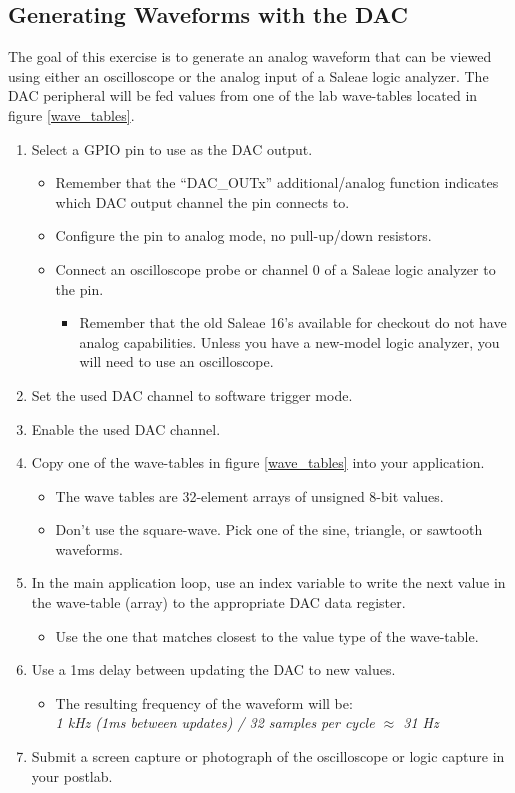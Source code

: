 \documentclass[openany,11pt,fleqn]{book} %
\begin{document}
\subsection{Generating Waveforms with the DAC}
The goal of this exercise is to generate an analog waveform that can be viewed using either an oscilloscope or the analog input of a Saleae logic analyzer. The DAC peripheral will be fed values from one of the lab wave-tables located in figure \ref{wave_tables}.

\begin{enumerate}
    \item Select a GPIO pin to use as the DAC output.
    \begin{itemize}
        \item Remember that the ``DAC\_OUTx'' additional/analog function indicates which DAC output channel the pin connects to. 
        \item Configure the pin to analog mode, no pull-up/down resistors.
        \item Connect an oscilloscope probe or channel 0 of a Saleae logic analyzer to the pin.
        \begin{itemize}
            \item Remember that the old Saleae 16's available for checkout do not have analog capabilities. Unless you have a new-model logic analyzer, you will need to use an oscilloscope. 
        \end{itemize}    
    \end{itemize}
    \item Set the used DAC channel to software trigger mode. 
    \item Enable the used DAC channel. 
    \item Copy one of the wave-tables in figure \ref{wave_tables} into your application. 
    \begin{itemize}
        \item The wave tables are 32-element arrays of unsigned 8-bit values.
        \item Don't use the square-wave. Pick one of the sine, triangle, or sawtooth waveforms. 
    \end{itemize}
    \item In the main application loop, use an index variable to write the next value in the wave-table (array) to the appropriate DAC data register. 
    \begin{itemize}
        \item Use the one that matches closest to the value type of the wave-table.
    \end{itemize}
    \item Use a 1ms delay between updating the DAC to new values. 
    \begin{itemize}
        \item The resulting frequency of the waveform will be: \\ \textit{1 kHz (1ms between updates) / 32 samples per cycle $\approx$ 31 Hz}
    \end{itemize}
    \item Submit a screen capture or photograph of the oscilloscope or logic capture in your postlab.
\end{enumerate}
\end{document}
